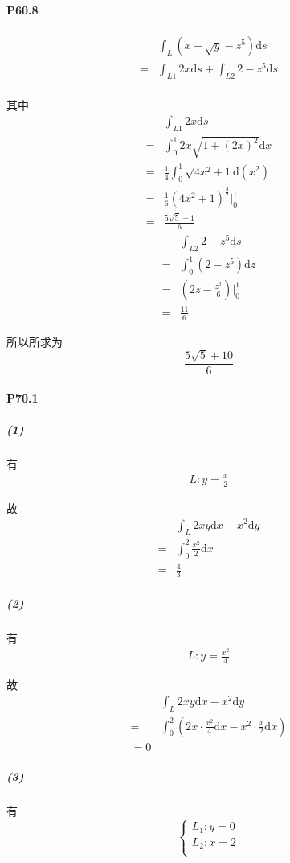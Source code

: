 \documentclass[UTF8]{ctexart}
\begin{document}
    \paragraph*{P60.8}
    \begin{align*}
        &\int_{L} (x+\sqrt{y} -z^5)\mathrm{d}s \\
        =& \int_{L1}^{} 2x \mathrm{d}s + \int_{L2}^{} 2-z^5 \mathrm{d}s \\
    \end{align*}

    其中
    \begin{align*}
        &\int_{L1}^{} 2x \mathrm{d}s \\
        =& \int_{0}^{1} 2x \sqrt{1+(2x)^2} \mathrm{d}x \\
        =& \frac{1}{4} \int_{0}^{1} \sqrt{4x^2+1} \mathrm{d}(x^2) \\
        =& \frac{1}{6} (4x^2+1)^{\frac{3}{2} } \big|_{0}^{1} \\
        =& \frac{5\sqrt{5}-1}{6} 
    \end{align*}
    \begin{align*}
        &\int_{L2}^{} 2-z^5 \mathrm{d}s \\
        =& \int_{0}^{1} (2-z^5)\mathrm{d}z \\
        =& (2z-\frac{z^6}{6} )\big|_{0}^{1} \\
        =&\frac{11}{6} 
    \end{align*}

    所以所求为\[
        \frac{5\sqrt{5}+10}{6} 
    \]
    \paragraph*{P70.1}
    \subparagraph*{(1)}

    有
    \begin{align*}
        L:y=\frac{x}{2} 
    \end{align*}

    故
    \begin{align*}
        &\int_{L} 2xy \mathrm{d}x - x^2 \mathrm{d}y \\
        =& \int_{0}^{2} \frac{x^2}{2} \mathrm{d}x \\
        =& \frac{4}{3} 
    \end{align*}
    \subparagraph*{(2)}
    有
    \begin{align*}
        L:y=\frac{x^2}{4} 
    \end{align*}

    故
    \begin{align*}
        &\int_{L} 2xy \mathrm{d}x - x^2 \mathrm{d}y \\
        =& \int_{0}^{2} (2x\cdot \frac{x^2}{4} \mathrm{d}x - x^2 \cdot \frac{x}{2} \mathrm{d}x) \\
        = 0
    \end{align*}
    \subparagraph*{(3)}
    有
    \begin{equation*}
        \begin{cases}
            L_1:y=0\\
            L_2:x=2\\
        \end{cases}
    \end{equation*}
\end{document}
